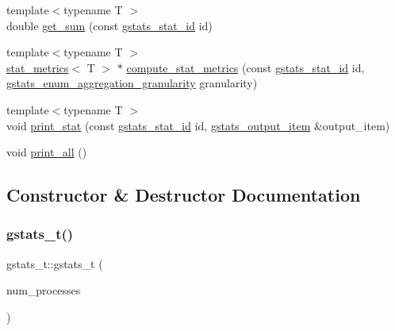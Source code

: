 \begin{DoxyCompactItemize}
\item 
{\footnotesize template$<$typename T $>$ }\\double \hyperlink{classgstats__t_a3529ce1c55852403a24c299625fcce20}{get\+\_\+sum} (const \hyperlink{gstats_8h_a662beb90f6d56f5ee9df4d812d39aa33}{gstats\+\_\+stat\+\_\+id} id)
\item 
{\footnotesize template$<$typename T $>$ }\\\hyperlink{structgstats__t_1_1stat__metrics}{stat\+\_\+metrics}$<$ T $>$ $\ast$ \hyperlink{classgstats__t_a9764e6abeef0768a6f992e5e05bb22cc}{compute\+\_\+stat\+\_\+metrics} (const \hyperlink{gstats_8h_a662beb90f6d56f5ee9df4d812d39aa33}{gstats\+\_\+stat\+\_\+id} id, \hyperlink{gstats_8h_a625875e2a7c8582f278735673cfb398c}{gstats\+\_\+enum\+\_\+aggregation\+\_\+granularity} granularity)
\item 
{\footnotesize template$<$typename T $>$ }\\void \hyperlink{classgstats__t_aa7a55d9e67eeff816ed6cafc3ead608f}{print\+\_\+stat} (const \hyperlink{gstats_8h_a662beb90f6d56f5ee9df4d812d39aa33}{gstats\+\_\+stat\+\_\+id} id, \hyperlink{classgstats__output__item}{gstats\+\_\+output\+\_\+item} \&output\+\_\+item)
\item 
void \hyperlink{classgstats__t_acf55dea2c0abe2dd5564f23a53c4fd15}{print\+\_\+all} ()
\end{DoxyCompactItemize}


\subsection{Constructor \& Destructor Documentation}
\mbox{\label{classgstats__t_a8799bbb87ebba7af97007a7774092518}} 
\subsubsection{\texorpdfstring{gstats\+\_\+t()}{gstats\_t()}}
{\footnotesize\ttfamily gstats\+\_\+t\+::gstats\+\_\+t (\begin{DoxyParamCaption}\item[{const int}]{num\+\_\+processes }\end{DoxyParamCaption})\hspace{0.3cm}{\ttfamily [inline]}}

\mbox{\label{classgstats__t_a0638a31844fd63d17ba55d54d34e55af}} 
